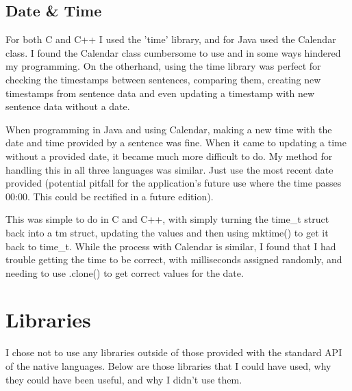 \documentclass{article}
\begin{document}
\subsection{Date \& Time}

For both C and C++ I used the 'time' library\cite{time}, and for Java used the Calendar class. I found the Calendar class cumbersome to use and in some ways hindered my programming. On the otherhand, using the time library was perfect for checking the timestamps between sentences, comparing them, creating new timestamps from sentence data and even updating a timestamp with new sentence data without a date. 

When programming in Java and using Calendar, making a new time with the date and time provided by a sentence was fine. When it came to updating a time without a provided date, it became much more difficult to do. My method for handling this in all three languages was similar. Just use the most recent date provided (potential pitfall for the application's future use where the time passes 00:00. This could be rectified in a future edition). 

This was simple to do in C and C++, with simply turning the time\_t struct back into a tm struct, updating the values and then using mktime() to get it back to time\_t. While the process with Calendar is similar, I found that I had trouble getting the time to be correct, with milliseconds assigned randomly, and needing to use .clone() to get correct values for the date.








\section{Libraries}

I chose not to use any libraries outside of those provided with the standard API of the native languages. Below are those libraries that I could have used, why they could have been useful, and why I didn't use them.
\end{document}
